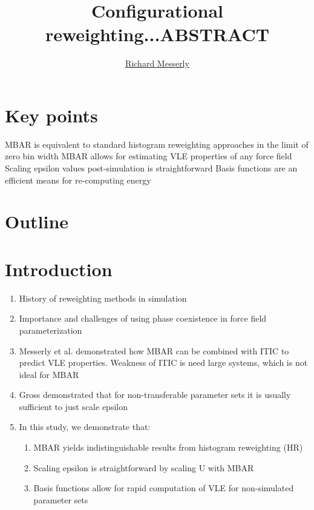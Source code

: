 \documentclass[11pt,a4paper]{article}
\begin{document}
	\thispagestyle{empty}
	\title{\Large \textbf{Configurational reweighting...}}
	\author[1]{\large {\underline{Richard Messerly}}}%
	
	
	\date{} %
	\maketitle\thispagestyle{empty} %
	\begin{center}
		\title{\textbf{ABSTRACT}}\centering{}
	\end{center}
	\justify
	
\section*{Key points}

MBAR is equivalent to standard histogram reweighting approaches in the limit of zero bin width
MBAR allows for estimating VLE properties of any force field
Scaling epsilon values post-simulation is straightforward
Basis functions are an efficient means for re-computing energy

\section*{Outline}

\section{Introduction}

\begin{enumerate}
	\item History of reweighting methods in simulation
	\item Importance and challenges of using phase coexistence in force field parameterization
	\item Messerly et al. demonstrated how MBAR can be combined with ITIC to predict VLE properties. Weakness of ITIC is need large systems, which is not ideal for MBAR
	\item Gross demonstrated that for non-transferable parameter sets it is usually sufficient to just scale epsilon
	\item In this study, we demonstrate that:
	\begin{enumerate}
		\item MBAR yields indistinguishable results from histogram reweighting (HR)
		\item Scaling epsilon is straightforward by scaling U with MBAR
		\item Basis functions allow for rapid computation of VLE for non-simulated parameter sets
	\end{enumerate}
\end{enumerate}
\end{document}

